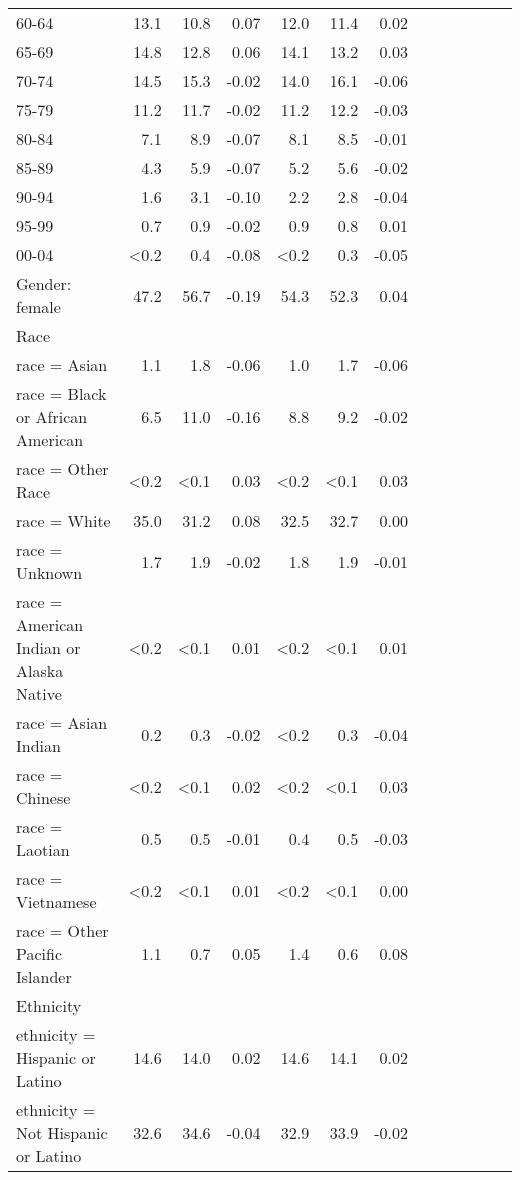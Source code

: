 \documentclass[11pt,]{article}
\begin{document}
\begin{longtable}{lrrrrrrrrrrrr}
      60-64 & 13.1 & 10.8 &  0.07 & 12.0 & 11.4 &  0.02 \\ 
      65-69 & 14.8 & 12.8 &  0.06 & 14.1 & 13.2 &  0.03 \\ 
      70-74 & 14.5 & 15.3 & -0.02 & 14.0 & 16.1 & -0.06 \\ 
      75-79 & 11.2 & 11.7 & -0.02 & 11.2 & 12.2 & -0.03 \\ 
      80-84 &  7.1 &  8.9 & -0.07 &  8.1 &  8.5 & -0.01 \\ 
      85-89 &  4.3 &  5.9 & -0.07 &  5.2 &  5.6 & -0.02 \\ 
      90-94 &  1.6 &  3.1 & -0.10 &  2.2 &  2.8 & -0.04 \\ 
      95-99 &  0.7 &  0.9 & -0.02 &  0.9 &  0.8 &  0.01 \\ 
      00-04 & <0.2 &  0.4 & -0.08 & <0.2 &  0.3 & -0.05 \\ 
  Gender: female & 47.2 & 56.7 & -0.19 & 54.3 & 52.3 &  0.04 \\ 
  Race &    &    &     &    &    &     \\ 
      race = Asian &  1.1 &  1.8 & -0.06 &  1.0 &  1.7 & -0.06 \\ 
      race = Black or African American &  6.5 & 11.0 & -0.16 &  8.8 &  9.2 & -0.02 \\ 
      race = Other Race & <0.2 & <0.1 &  0.03 & <0.2 & <0.1 &  0.03 \\ 
      race = White & 35.0 & 31.2 &  0.08 & 32.5 & 32.7 &  0.00 \\ 
      race = Unknown &  1.7 &  1.9 & -0.02 &  1.8 &  1.9 & -0.01 \\ 
      race = American Indian or Alaska Native & <0.2 & <0.1 &  0.01 & <0.2 & <0.1 &  0.01 \\ 
      race = Asian Indian &  0.2 &  0.3 & -0.02 & <0.2 &  0.3 & -0.04 \\ 
      race = Chinese & <0.2 & <0.1 &  0.02 & <0.2 & <0.1 &  0.03 \\ 
      race = Laotian &  0.5 &  0.5 & -0.01 &  0.4 &  0.5 & -0.03 \\ 
      race = Vietnamese & <0.2 & <0.1 &  0.01 & <0.2 & <0.1 &  0.00 \\ 
      race = Other Pacific Islander &  1.1 &  0.7 &  0.05 &  1.4 &  0.6 &  0.08 \\ 
  Ethnicity &    &    &     &    &    &     \\ 
      ethnicity = Hispanic or Latino & 14.6 & 14.0 &  0.02 & 14.6 & 14.1 &  0.02 \\ 
      ethnicity = Not Hispanic or Latino & 32.6 & 34.6 & -0.04 & 32.9 & 33.9 & -0.02 \\ 

\end{longtable}
\end{document}
